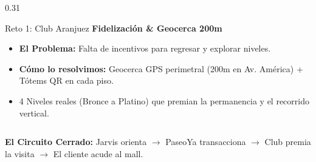\documentclass[aspectratio=169, 10pt]{beamer}
\begin{document}
\begin{frame}
\begin{columns}[T]
    \begin{column}{0.31\textwidth}
      \begin{exampleblock}{Reto 1: Club Aranjuez}
        \scriptsize
        \textbf{Fidelización \& Geocerca 200m}
        \begin{itemize}\setlength\itemsep{0.25em}
          \item \textbf{El Problema:} Falta de incentivos para regresar y explorar niveles.
          \item \textbf{Cómo lo resolvimos:} Geocerca GPS perimetral (200m en Av. América) + Tótems QR en cada piso.
          \item 4 Niveles reales (Bronce a Platino) que premian la permanencia y el recorrido vertical.
        \end{itemize}
      \end{exampleblock}
    \end{column}
  \end{columns}

  \vskip 0.3cm
  \centering
  \color{AranjuezGreen}\footnotesize \textbf{El Circuito Cerrado:} Jarvis orienta $\rightarrow$ PaseoYa transacciona $\rightarrow$ Club premia la visita $\rightarrow$ El cliente acude al mall.
\end{frame}
\end{document}
